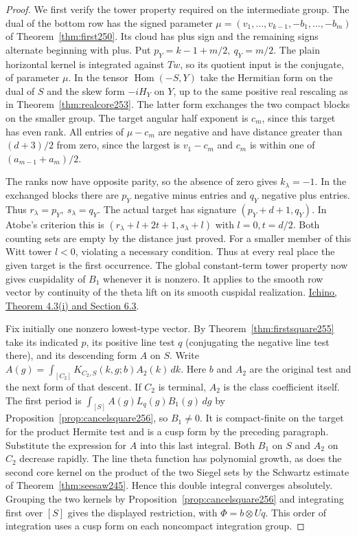 \documentclass[a4paper,11pt]{article}
\theoremstyle{definition}
\theoremstyle{remark}
\numberwithin{equation}{section}
\begin{document}
\begin{proof}
We first verify the tower property required on the intermediate
group. The dual of the bottom row has the signed parameter
\(\mu=(v_1,\ldots,v_{k-1},-b_1,\ldots,-b_m)\) of
Theorem~\ref{thm:first250}. Its cloud has plus sign and the
remaining signs alternate beginning with plus. Put
\(p_Y=k-1+m/2,\ q_Y=m/2\). The plain horizontal kernel is
integrated against \(Tw\), so its quotient input is the
conjugate, of parameter \(\mu\). In the tensor
\(\operatorname{Hom}(-S,Y)\) take the Hermitian form on the
dual of \(S\) and the skew form \(-iH_Y\) on \(Y\), up to
the same positive real rescaling as in
Theorem~\ref{thm:realcore253}. The latter form exchanges the
two compact blocks on the smaller group. The target angular
half exponent is \(c_m\), since this target has even rank.
All entries of \(\mu-c_m\) are negative and have distance
greater than \((d+3)/2\) from zero, since the largest is \(v_1-c_m\)
and \(c_m\) is within one of \((a_{m-1}+a_m)/2\).

The ranks now have opposite parity, so the absence of zero
gives \(k_\lambda=-1\). In the exchanged blocks there are
\(p_Y\) negative minus entries and \(q_Y\) negative plus
entries. Thus \(r_\lambda=p_Y,\ s_\lambda=q_Y\). The actual
target has signature \((p_Y+d+1,q_Y)\). In Atobe's criterion
this is \((r_\lambda+l+2t+1,s_\lambda+l)\) with \(l=0,t=d/2\).
Both counting sets are empty by the distance just proved.
For a smaller member of this Witt tower \(l<0\), violating a
necessary condition. Thus at every real place the given target
is the first occurrence. The global constant-term tower
property now gives cuspidality of \(B_1\) whenever it is
nonzero. It applies to the smooth row vector by continuity of
the theta lift on its smooth cuspidal realization.
\href{https://arxiv.org/pdf/2002.09148}{Ichino,
Theorem 4.3(i) and Section 6.3}.

Fix initially one nonzero lowest-type vector. By
Theorem~\ref{thm:firstsquare255} take its indicated \(p\),
its positive line test \(q\) (conjugating the negative line
test there), and its descending form \(A\) on \(S\).
Write \(A(g)=\int_{[C_2]}K_{C_2,S}(k,g;b)A_2(k)\,dk\).
Here \(b\) and \(A_2\) are the original test and the next
form of that descent. If \(C_2\) is terminal, \(A_2\) is
the class coefficient itself. The first period is
\(\int_{[S]}A(g)L_q(g)B_1(g)\,dg\) by
Proposition~\ref{prop:cancelsquare256}, so \(B_1\ne0\).
It is compact-finite on the target for the product Hermite
test and is a cusp form by the preceding paragraph. Substitute
the expression for \(A\) into this last integral. Both \(B_1\)
on \(S\) and \(A_2\) on \(C_2\) decrease rapidly. The line
theta function has polynomial growth, as does the second core
kernel on the product of the two Siegel sets by the Schwartz
estimate of Theorem~\ref{thm:seesaw245}. Hence this double
integral converges absolutely. Grouping the two kernels by
Proposition~\ref{prop:cancelsquare256} and integrating first
over \([S]\) gives the displayed restriction, with
\(\Phi=b\otimes Uq\). This order of integration uses a cusp
form on each noncompact integration group.


\end{proof}
\end{document}

